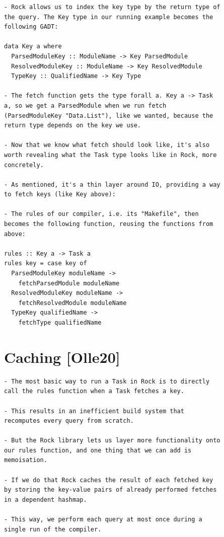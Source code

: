 \begin{verbatim}
- Rock allows us to index the key type by the return type of
the query. The Key type in our running example becomes the
following GADT:

data Key a where
  ParsedModuleKey :: ModuleName -> Key ParsedModule
  ResolvedModuleKey :: ModuleName -> Key ResolvedModule
  TypeKey :: QualifiedName -> Key Type

- The fetch function gets the type forall a. Key a -> Task
a, so we get a ParsedModule when we run fetch
(ParsedModuleKey "Data.List"), like we wanted, because the
return type depends on the key we use.

- Now that we know what fetch should look like, it's also
worth revealing what the Task type looks like in Rock, more
concretely.

- As mentioned, it's a thin layer around IO, providing a way
to fetch keys (like Key above):

- The rules of our compiler, i.e. its "Makefile", then
becomes the following function, reusing the functions from
above:

rules :: Key a -> Task a
rules key = case key of
  ParsedModuleKey moduleName ->
    fetchParsedModule moduleName
  ResolvedModuleKey moduleName ->
    fetchResolvedModule moduleName
  TypeKey qualifiedName ->
    fetchType qualifiedName
\end{verbatim}
\cite{olle_query_based}

\section*{Caching [Olle20]}

\begin{verbatim}
- The most basic way to run a Task in Rock is to directly
call the rules function when a Task fetches a key.

- This results in an inefficient build system that
recomputes every query from scratch.

- But the Rock library lets us layer more functionality onto
our rules function, and one thing that we can add is
memoisation.

- If we do that Rock caches the result of each fetched key
by storing the key-value pairs of already performed fetches
in a dependent hashmap.

- This way, we perform each query at most once during a
single run of the compiler.
\end{verbatim}
\cite{olle_query_based}

